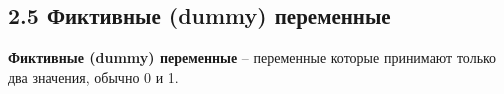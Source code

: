 \documentclass[a0,final]{a0poster}
\begin{document}
\begin{multicols}{4}


\subsection*{\textbf{2.5 Фиктивные (dummy) переменные}}
\begin{tcolorbox}[colback=red!5!white,colframe=red!75!black]
\textbf{Фиктивные (dummy) переменные} -- переменные которые принимают только два значения, обычно 0 и 1.
\end{tcolorbox}

\end{multicols}
\end{document}
